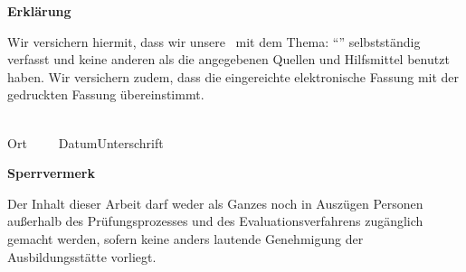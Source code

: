 

\newpage
\thispagestyle{empty}
\begin{framed}
\begin{center}
\Large\bfseries Erklärung
\end{center}
\medskip
\noindent
Wir versichern hiermit, dass wir unsere \Was\ mit
dem Thema: \enquote{\Titel} selbstständig verfasst und keine anderen als die angegebenen Quellen und
Hilfsmittel benutzt haben. Wir versichern zudem, dass die eingereichte elektronische Fassung mit der
gedruckten Fassung übereinstimmt.

\vspace{3cm}
\noindent
\underline{\hspace{4cm}}\hfill\underline{\hspace{6cm}}\\
Ort~~~~~Datum\hfill Unterschrift\hspace{4cm}
\end{framed}

\vfill
\begin{framed}
\begin{center}
\Large\bfseries Sperrvermerk
\end{center}
\medskip
\noindent
Der Inhalt dieser Arbeit darf weder als Ganzes noch in Auszügen Personen
außerhalb des Prüfungsprozesses und des Evaluationsverfahrens zugänglich gemacht
werden, sofern keine anders lautende Genehmigung der Ausbildungsstätte vorliegt.
\end{framed}

\endinput
